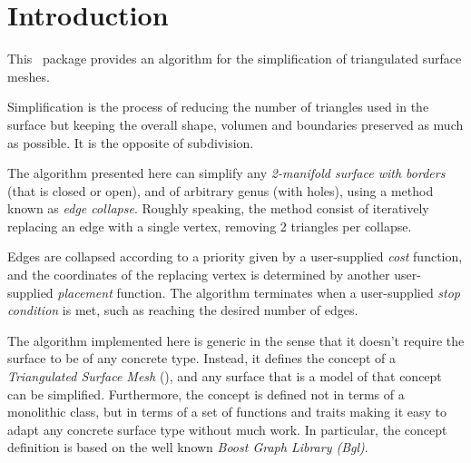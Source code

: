 
\section{Introduction}

This \cgal\ package provides an algorithm for the simplification of triangulated surface meshes.

Simplification is the process of reducing the number of triangles used in the surface but keeping the overall shape, volumen and boundaries preserved as much as possible. It is the opposite of subdivision.


The algorithm presented here can simplify any {\em 2-manifold surface with borders} (that is closed or open), and of arbitrary genus (with holes), using a method known as {\em edge collapse}. Roughly speaking, the method consist of iteratively replacing an edge with a single vertex, removing 2 triangles per collapse.


Edges are collapsed according to a priority given by a user-supplied {\em cost} function, and the coordinates of the replacing vertex is determined by another user-supplied {\em placement} function. The algorithm terminates when a user-supplied {\em stop condition} is met, such as reaching the desired number of edges.

The algorithm implemented here is generic in the sense that it doesn't require the surface to be of any concrete type. Instead, it defines the concept of a {\em Triangulated Surface Mesh} (), and any surface that is a model of that concept can be simplified. Furthermore, the concept is defined not in terms of a monolithic class, but in terms of a set of functions and traits making it easy to adapt any concrete surface type without much work. In particular, the concept definition is based on the well known {\em Boost Graph Library ({\sc Bgl})}.

